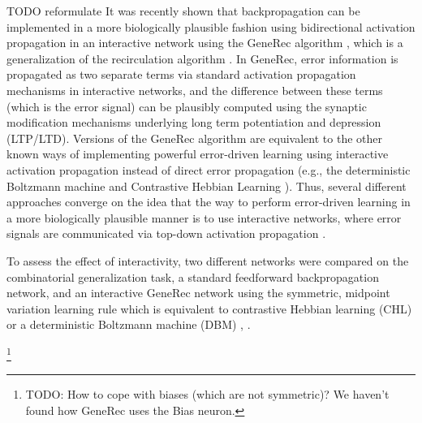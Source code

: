 TODO reformulate 
It was recently shown that backpropagation can be implemented in a more biologically plausible fashion using bidirectional activation propagation in an interactive network using the GeneRec algorithm \citet{o1996bio}, which is a generalization of the recirculation algorithm \citet{hinton1988learning}. In GeneRec, error information is propagated as two separate terms via standard activation propagation mechanisms in interactive networks, and the difference between these terms (which is the error signal) can be plausibly computed using the synaptic modification mechanisms underlying long term potentiation and depression (LTP/LTD). Versions of the GeneRec algorithm are equivalent to the other known ways of implementing powerful error-driven learning using interactive activation propagation instead of direct error propagation (e.g., the deterministic Boltzmann machine \citet{hinton1989deterministic} and Contrastive Hebbian Learning \citet{movellan1990contrastive}). Thus, several different approaches converge on the idea that the way to perform error-driven learning in a more biologically plausible manner is to use interactive networks, where error signals are communicated via top-down activation propagation \citet{o2001generalization}.



To assess the effect of interactivity, two different networks were compared on the combinatorial generalization task, a standard feedforward backpropagation network, and an interactive GeneRec network using the symmetric, midpoint variation learning rule which is equivalent to contrastive Hebbian learning (CHL) or a deterministic Boltzmann machine (DBM) \citet{o1996bio}, \citet{o2001generalization}. 
 
\footnote{TODO: How to cope with biases (which are not symmetric)? We haven't found how GeneRec uses the Bias neuron.} 
